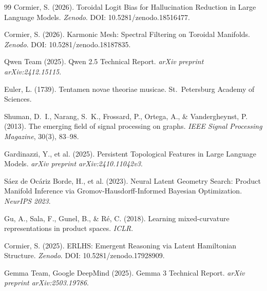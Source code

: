 \documentclass[11pt,a4paper]{article}
\begin{document}
\begin{thebibliography}{99}
Cormier, S. (2026).
Toroidal Logit Bias for Hallucination Reduction in Large Language Models.
\textit{Zenodo}. DOI: 10.5281/zenodo.18516477.

Cormier, S. (2026).
Karmonic Mesh: Spectral Filtering on Toroidal Manifolds.
\textit{Zenodo}. DOI: 10.5281/zenodo.18187835.

Qwen Team (2025).
Qwen 2.5 Technical Report.
\textit{arXiv preprint arXiv:2412.15115}.

Euler, L. (1739).
Tentamen novae theoriae musicae.
St.\ Petersburg Academy of Sciences.

Shuman, D.~I., Narang, S.~K., Frossard, P., Ortega, A., \& Vandergheynst, P. (2013).
The emerging field of signal processing on graphs.
\textit{IEEE Signal Processing Magazine}, 30(3), 83--98.

Gardinazzi, Y., et al. (2025).
Persistent Topological Features in Large Language Models.
\textit{arXiv preprint arXiv:2410.11042v3}.

S\'{a}ez de Oc\'{a}riz Borde, H., et al. (2023).
Neural Latent Geometry Search: Product Manifold Inference via Gromov-Hausdorff-Informed Bayesian Optimization.
\textit{NeurIPS 2023}.

Gu, A., Sala, F., Gunel, B., \& R\'{e}, C. (2018).
Learning mixed-curvature representations in product spaces.
\textit{ICLR}.

Cormier, S. (2025).
ERLHS: Emergent Reasoning via Latent Hamiltonian Structure.
\textit{Zenodo}. DOI: 10.5281/zenodo.17928909.

Gemma Team, Google DeepMind (2025).
Gemma 3 Technical Report.
\textit{arXiv preprint arXiv:2503.19786}.

\end{thebibliography}
\end{document}
